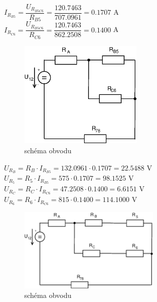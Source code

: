 \documentclass[10pt,a4paper]{article}
\begin{document}
    \begin{center}
     \begin{large}
      $ I_{R_{B5}}=\dfrac{U_{R_{B5C6}}}{R_{B5}}  = \dfrac{120.7463}{707.0961} =0.1707 $ A
      \\[6pt]
     $ I_{R_{C6}}=\dfrac{U_{R_{B5C6}}}{R_{C6}}  = \dfrac{120.7463}{862.2508} =0.1400 $ A
     \\[20pt]
   \end{large}
  \end{center}
  
  \begin{figure}[ht]
    \begin{center}
     \includegraphics[width=0.523\textwidth]{2020.eps}
      \caption{schéma obvodu}
    \end{center}
   \end{figure}   
   \newpage  
   
   \begin{center}
     \begin{large}
      $ U_{R_B} = R_B \cdot I_{R_{B5}}=132.0961 \cdot 0.1707  =22.5488 $ V
      \\[6pt]
      $ U_{R_5}= R_5 \cdot I_{R_{B5}}=575 \cdot 0.1707  =98.1525 $ V
      \\[6pt]
      $ U_{R_C}= R_C \cdot I_{R_{C6}}=47.2508  \cdot 0.1400  =6.6151 $ V
      \\[6pt]
      $ U_{R_6}= R_6 \cdot I_{R_{C6}}=815 \cdot 0.1400  =114.1000 $ V
     \\[20pt]
   \end{large}
  \end{center}
   
   \begin{figure}[ht]
    \begin{center}
     \includegraphics[width=0.6\textwidth]{2019.eps}
      \caption{schéma obvodu}
    \end{center}
   \end{figure} 
   
\end{document}
